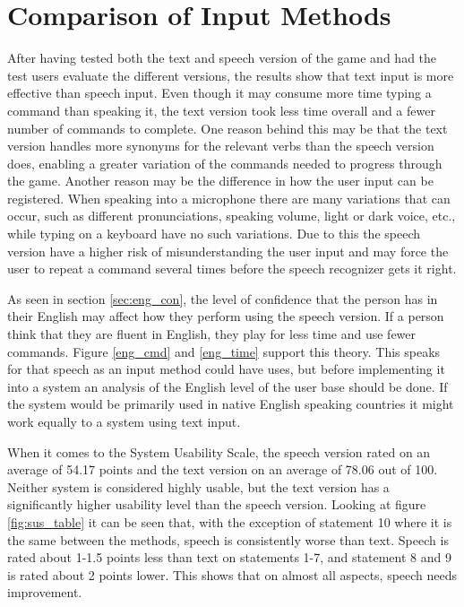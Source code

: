 \section{Comparison of Input Methods} %
After having tested both the text and speech version of the game and had the test users evaluate the different versions, the results show that text input is more effective than speech input. Even though it may consume more time typing a command than speaking it, the text version took less time overall and a fewer number of commands to complete. One reason behind this may be that the text version handles more synonyms for the relevant verbs than the speech version does, enabling a greater variation of the commands needed to progress through the game. Another reason may be the difference in how the user input can be registered. When speaking into a microphone there are many variations that can occur, such as different pronunciations, speaking volume, light or dark voice, etc., while typing on a keyboard have no such variations. Due to this the speech version have a higher risk of misunderstanding the user input and may force the user to repeat a command several times before the speech recognizer gets it right. 

As seen in section \ref{sec:eng_con}, the level of confidence that the person has in their English may affect how they perform using the speech version. If a person think that they are fluent in English, they play for less time and use fewer commands. Figure \ref{eng_cmd} and \ref{eng_time} support this theory. This speaks for that speech as an input method could have uses, but before implementing it into a system an analysis of the English level of the user base should be done. If the system would be primarily used in native English speaking countries it might work equally to a system using text input.

When it comes to the System Usability Scale, the speech version rated on an average of 54.17 points and the text version on an average of 78.06 out of 100. Neither system is considered highly usable, but the text version has a significantly higher usability level than the speech version. Looking at figure \ref{fig:sus_table} it can be seen that, with the exception of statement 10 where it is the same between the methods, speech is consistently worse than text. Speech is rated about 1-1.5 points less than text on statements 1-7, and statement 8 and 9 is rated about 2 points lower. This shows that on almost all aspects, speech needs improvement. 

